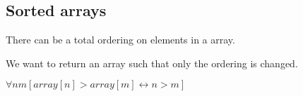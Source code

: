 
\subsection{Sorted arrays}

There can be a total ordering on elements in a array.

We want to return an array such that only the ordering is changed.

\(\forall nm [array[n]>array[m] \leftrightarrow n>m]\)


